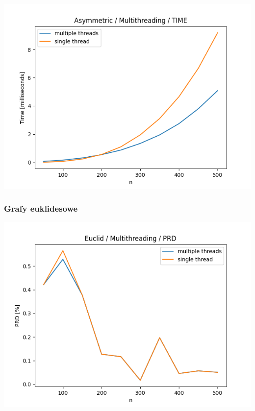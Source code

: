 \documentclass{article}
\begin{document}
\begin{center}
\includegraphics[width=\textwidth, 
                   height = 0.4\textheight, 
                   keepaspectratio]
                  {plots/multithreading_asymmetric_time} 
\end{center}

\subsubsection{Grafy euklidesowe}

\begin{center}
\includegraphics[width=\textwidth, 
                   height = 0.4\textheight, 
                   keepaspectratio]
                  {plots/multithreading_euclid_prd} 
\end{center}
\end{document}
